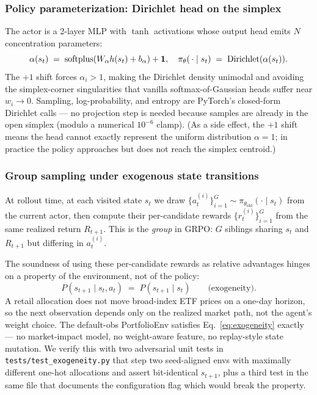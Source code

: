 \subsubsection{Policy parameterization: Dirichlet head on the simplex}

The actor is a 2-layer MLP with $\tanh$ activations whose output head emits
$N$ concentration parameters:
\begin{equation}
\alpha(s_t) \;=\; \operatorname{softplus}(W_\alpha h(s_t) + b_\alpha) + \mathbf{1},
\quad
\pi_\theta(\,\cdot \mid s_t) \;=\; \mathrm{Dirichlet}(\alpha(s_t)).
\end{equation}
The $+1$ shift forces $\alpha_i > 1$, making the Dirichlet density unimodal
and avoiding the simplex-corner singularities that vanilla softmax-of-Gaussian
heads suffer near $w_i \to 0$. Sampling, log-probability, and entropy are
PyTorch's closed-form Dirichlet calls --- no projection step is needed
because samples are already in the open simplex (modulo a numerical
$10^{-6}$ clamp). (As a side effect, the $+1$ shift means the head
cannot exactly represent the uniform distribution $\alpha{=}1$; in
practice the policy approaches but does not reach the simplex
centroid.)

\subsubsection{Group sampling under exogenous state transitions}
\label{sec:method:grpo:exogeneity}

At rollout time, at each visited state $s_t$ we draw
$\{a_t^{(i)}\}_{i=1}^G \sim \pi_{\theta_{\text{old}}}(\cdot \mid s_t)$ from
the current actor, then compute their per-candidate rewards
$\{r_t^{(i)}\}_{i=1}^G$ from the same realized return $R_{t+1}$.
This is the \emph{group} in GRPO: $G$ siblings sharing $s_t$ and
$R_{t+1}$ but differing in $a_t^{(i)}$.

The soundness of using these per-candidate rewards as relative advantages
hinges on a property of the environment, not of the policy:
\begin{equation}
\label{eq:exogeneity}
P(s_{t+1} \mid s_t, a_t) \;=\; P(s_{t+1} \mid s_t) \qquad \text{(exogeneity)}.
\end{equation}
A retail allocation does not move broad-index ETF prices on a one-day
horizon, so the next observation depends only on the realized market path,
not the agent's weight choice. The default-obs PortfolioEnv satisfies
Eq.~\ref{eq:exogeneity} exactly --- no market-impact model, no
weight-aware feature, no replay-style state mutation. We verify this with two adversarial unit tests in
\texttt{tests/test\_exogeneity.py} that step two seed-aligned envs with
maximally different one-hot allocations and assert bit-identical
$s_{t+1}$, plus a third test in the same file that documents the
configuration flag which would break the property.

